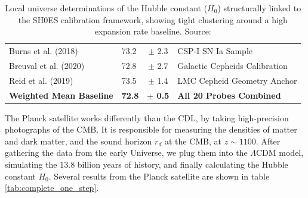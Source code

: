 \documentclass{book}
\begin{document}
\begin{table}[h!]
\begin{tabular}{llcl}
			Burns et al. (2018)           & 73.2  & $\pm$ 2.3  & CSP-I SN Ia Sample \\
			Breuval et al. (2020)         & 72.8  & $\pm$ 2.7  & Galactic Cepheids Calibration \\
			Reid et al. (2019)            & 73.5  & $\pm$ 1.4  & LMC Cepheid Geometry Anchor \\
			\hline
			\textbf{Weighted Mean Baseline} & \textbf{72.8} & \textbf{$\pm$ 0.5} & \textbf{All 20 Probes Combined} \\
			\hline\hline
		\end{tabular}
		\normalsize
		\caption{Local universe determinations of the Hubble constant ($H_0$) structurally linked to the SH0ES calibration framework, showing tight clustering around a high expansion rate baseline. Source: \cite{perivolaropoulos2024hubbletensiondistanceladder}}
		\label{tab:complete_distance_ladder}
	\end{table}
	
	The Planck satellite works differently than the CDL, by taking high-precision photographs of the CMB. It is responsible for measuring the densities of matter and dark matter, and the sound horizon $r_d$ at the CMB, at $z\sim 1100$. After gathering the data from the early Universe, we plug them into the $\Lambda$CDM model, simulating the 13.8 billion years of history, and finally calculating the Hubble constant $H_0$. Several results from the Planck satellite are shown in table \ref{tab:complete_one_step}.
	
\end{document}
